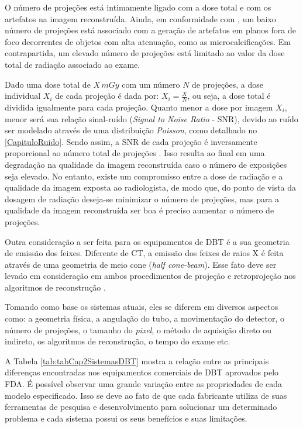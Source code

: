 O número de projeções está intimamente ligado com a dose total e com os artefatos na imagem reconstruída. Ainda, em conformidade com , um baixo número de projeções está associado com a geração de artefatos em planos fora de foco decorrentes de objetos com alta atenuação, como as microcalcificações. Em contrapartida, um elevado número de projeções está limitado ao valor da dose total de radiação associado ao exame. 

Dado uma dose total de $X\,mGy$ com um número $N$ de projeções, a dose individual $X_{i}$ de cada projeção é dada por: $X_{i} = \frac{X}{N}$, ou seja, a dose total é dividida igualmente para cada projeção. Quanto menor a dose por imagem $X_{i}$, menor será sua relação sinal-ruído (\textit{Signal to Noise Ratio} - \acs{SNR}), devido ao ruído ser modelado através de uma distribuição \textit{Poisson}, como detalhado no \autoref{CapituloRuido}. Sendo assim, a \acs{SNR} de cada projeção é inversamente proporcional ao número total de projeções \cite{sechopoulos2009optimization}. Isso resulta ao final em uma degradação na qualidade da imagem reconstruída caso o número de exposições seja elevado.  No entanto, existe um compromisso entre a dose de radiação e a qualidade da imagem exposta ao radiologista, de modo que, do ponto de vista da dosagem de radiação deseja-se minimizar o número de projeções, mas para a qualidade da imagem reconstruída ser boa é preciso aumentar o número de projeções.

Outra consideração a ser feita para os equipamentos de \acs{DBT} é a sua geometria de emissão dos feixes. Diferente de \acs{CT}, a emissão dos feixes de raios X é feita através de uma geometria de meio cone (\textit{half cone-beam}). Esse fato deve ser levado em consideração em ambos procedimentos de projeção e retroprojeção nos algoritmos de reconstrução \cite{wu2004comparison}. 
    
Tomando como base os sistemas atuais, eles se diferem em diversos aspectos como: a geometria física, a angulação do tubo, a movimentação do detector, o número de projeções, o tamanho do \textit{pixel}, o método de aquisição direto ou indireto, os algoritmos de reconstrução, o tempo do exame etc. 

A Tabela \ref{tab:tabCap2SistemasDBT} mostra a relação entre as principais diferenças encontradas nos equipamentos comerciais de \acs{DBT} aprovados pelo \acs{FDA}. É possível observar uma grande variação entre as propriedades de cada modelo especificado. Isso se deve ao fato de que cada fabricante utiliza de suas ferramentas de pesquisa e desenvolvimento para solucionar um determinado problema e cada sistema possui os seus benefícios e suas limitações. 

